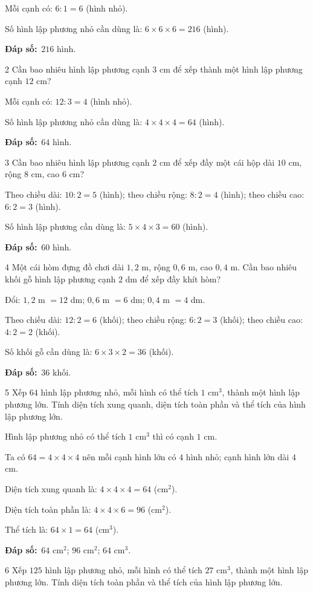 \documentclass[11pt]{article}
\newif\ifsol \solfalse
\providecommand{\AnsWord}{Đáp số}
\newcommand{\dapso}[1]{\par\textbf{\AnsWord:}\ #1}
\newcommand{\probsol}[1]{%
  \begin{lrbox}{\solmeasure}\begin{minipage}{\dimexpr\linewidth-24pt\relax}#1\end{minipage}\end{lrbox}%
  \ifsol
    \begin{solbox}#1\end{solbox}%
  \else
    \setlength{\solht}{\dimexpr\ht\solmeasure+\dp\solmeasure+0.85cm\relax}%
    \ifdim\solht<1.35cm\setlength{\solht}{1.35cm}\fi
    \begin{tcolorbox}[colback=white,colframe=Line,boxrule=0.8pt,arc=5pt,
      left=8pt,right=8pt,top=4pt,bottom=4pt,height=\solht]{\footnotesize\color{Slate}\itshape\WorkWord}\end{tcolorbox}%
  \fi}
\newcommand{\gap}{\vspace{0.3cm}}
\def\WorkWord{Bài làm:}
\def\AnsWord{Đáp số}
\begin{document}
\probsol{
Mỗi cạnh có: $6:1=6$ (hình nhỏ).\par
Số hình lập phương nhỏ cần dùng là: $6\times6\times6=216$ (hình).
\dapso{$216$ hình.}}
\gap
\begin{probbox}{2}{\relax}
Cần bao nhiêu hình lập phương cạnh $3$ cm để xếp thành một hình lập phương cạnh $12$ cm?
\end{probbox}
\probsol{
Mỗi cạnh có: $12:3=4$ (hình nhỏ).\par
Số hình lập phương nhỏ cần dùng là: $4\times4\times4=64$ (hình).
\dapso{$64$ hình.}}
\gap
\begin{probbox}{3}{\relax}
Cần bao nhiêu hình lập phương cạnh $2$ cm để xếp đầy một cái hộp dài $10$ cm, rộng $8$ cm, cao $6$ cm?
\end{probbox}
\probsol{
Theo chiều dài: $10:2=5$ (hình); theo chiều rộng: $8:2=4$ (hình); theo chiều cao: $6:2=3$ (hình).\par
Số hình lập phương cần dùng là: $5\times4\times3=60$ (hình).
\dapso{$60$ hình.}}
\gap
\begin{probbox}{4}{\relax}
Một cái hòm đựng đồ chơi dài $1{,}2$ m, rộng $0{,}6$ m, cao $0{,}4$ m. Cần bao nhiêu khối gỗ hình lập phương cạnh $2$ dm để xếp đầy khít hòm?
\end{probbox}
\probsol{
Đổi: $1{,}2$ m $=12$ dm; $0{,}6$ m $=6$ dm; $0{,}4$ m $=4$ dm.\par
Theo chiều dài: $12:2=6$ (khối); theo chiều rộng: $6:2=3$ (khối); theo chiều cao: $4:2=2$ (khối).\par
Số khối gỗ cần dùng là: $6\times3\times2=36$ (khối).
\dapso{$36$ khối.}}
\gap
\begin{probbox}{5}{\relax}
Xếp $64$ hình lập phương nhỏ, mỗi hình có thể tích $1$ cm$^3$, thành một hình lập phương lớn. Tính diện tích xung quanh, diện tích toàn phần và thể tích của hình lập phương lớn.
\end{probbox}
\probsol{
Hình lập phương nhỏ có thể tích $1$ cm$^3$ thì có cạnh $1$ cm.\par
Ta có $64=4\times4\times4$ nên mỗi cạnh hình lớn có $4$ hình nhỏ; cạnh hình lớn dài $4$ cm.\par
Diện tích xung quanh là: $4\times4\times4=64$ (cm$^2$).\par
Diện tích toàn phần là: $4\times4\times6=96$ (cm$^2$).\par
Thể tích là: $64\times1=64$ (cm$^3$).
\dapso{$64$ cm$^2$; $96$ cm$^2$; $64$ cm$^3$.}}
\gap
\begin{probbox}{6}{\relax}
Xếp $125$ hình lập phương nhỏ, mỗi hình có thể tích $27$ cm$^3$, thành một hình lập phương lớn. Tính diện tích toàn phần và thể tích của hình lập phương lớn.
\end{probbox}
\end{document}
